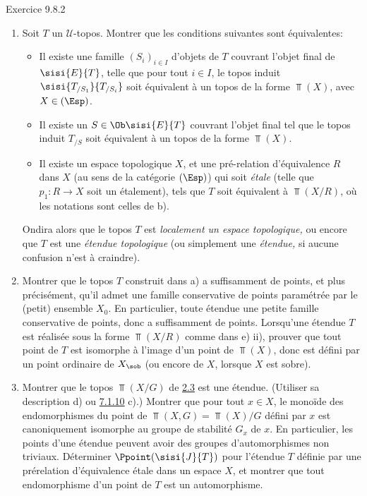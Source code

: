 \documentclass[10pt]{../fichiers-configuration-latex/smfart}
\begin{document}
\begin{enonce*}[remark]{Exercice 9.8.2}
\begin{enumerate}
\item Soit $T$ un $𝒰$-topos. Montrer que les conditions suivantes
sont équivalentes:
\begin{itemize}
\item[(i)] Il existe une famille $(S_i)_{i\in I}$ d'objets de $T$
couvrant l'objet final de $\sisi{E}{T}$, telle que pour tout $i\in I$, le
topos induit $\sisi{T_{/S_1}}{T_{/S_i}}$ soit équivalent à un topos de la forme
$\Top(X)$, avec $X\in(\Esp)$.

\item[${\rm (i')}$] Il existe un $S\in \Ob \sisi{E}{T}$ couvrant l'objet final
tel que le topos induit $T_{/S}$ soit équivalent à un topos de la
forme $\Top(X)$.

\item[(ii)] Il existe un espace topologique $X$, et une pré-relation
d'équivalence $R$ dans $X$ (au sens de la catégorie $(\Esp)$) qui
soit \emph{étale} (\ie telle que $p_1:R\rightarrow X$ soit un
étalement), tels que $T$ soit équivalent à $\Top(X/R)$, où les
notations sont celles de b).
\end{itemize}

On\pageoriginale dira alors que le topos $T$ est \emph{localement un
espace topologique,} ou encore que $T$ est une \emph{étendue
topologique} (ou simplement une \emph{étendue,} si aucune confusion
n'est à craindre).

\item Montrer que le topos $T$ construit dans a) a suffisamment de
points, et plus précisément, qu'il admet une famille conservative de
points paramétrée par le (petit) ensemble $X_0$. En particulier,
toute étendue  une petite famille conservative de points, donc a
suffisamment de points. Lorsqu'une étendue $T$ est réalisée sous la
forme $\Top(X/R)$ comme dans e) ii), prouver que tout point de $T$
est isomorphe à l'image d'un point de $\Top(X)$, donc est défini par
un point ordinaire de $X_{\sob}$ (ou encore de $X$, lorsque $X$ est
sobre).

\item Montrer que le topos $\Top(X/G)$ de \hyperref[IV.subsec2.3]{2.3} est une
étendue. (Utiliser sa description d) ou \hyperref[IV.exer7.1.10]{7.1.10} c).)
Montrer que pour tout $x\in X$, le monoïde des endomorphismes du
point de $\Top(X,G)=\Top(X)/G$ défini par $x$ est canoniquement
isomorphe au groupe de stabilité $G_x$ de $x$. En particulier, les
points d'une étendue peuvent avoir des groupes d'automorphismes non
triviaux. Déterminer $\Ppoint(\sisi{J}{T})$ pour l'étendue $T$ définie par une
prérelation d'équivalence étale dans un espace $X$, et montrer que
tout endomorphisme d'un point de $T$ est un automorphisme.


\end{enumerate}
\end{enonce*}
\end{document}
